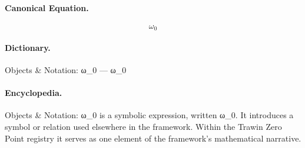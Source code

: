 \paragraph{Canonical Equation.}
\[
\omega_0
\]

\paragraph{Dictionary.}
Objects \& Notation: ω\_0 — ω\_0

\paragraph{Encyclopedia.}
Objects \& Notation: ω\_0 is a symbolic expression, written ω\_0. It introduces a symbol or relation used elsewhere in the framework. Within the Trawin Zero Point registry it serves as one element of the framework's mathematical narrative.
